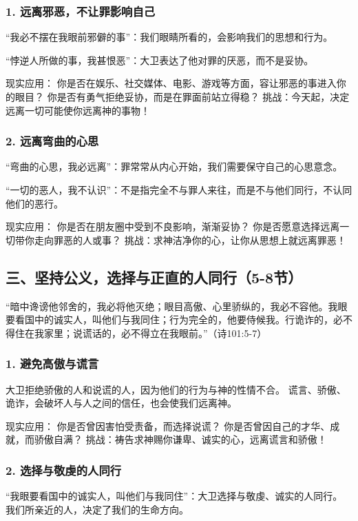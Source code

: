 \documentclass[a4paper, 12pt]{article}
\begin{document}
\subsubsection*{1. 远离邪恶，不让罪影响自己}
\hspace{0.4cm}“我必不摆在我眼前邪僻的事”：我们眼睛所看的，会影响我们的思想和行为。

“悖逆人所做的事，我甚恨恶”：大卫表达了他对罪的厌恶，而不是妥协。

现实应用：
你是否在娱乐、社交媒体、电影、游戏等方面，容让邪恶的事进入你的眼目？
你是否有勇气拒绝妥协，而是在罪面前站立得稳？
挑战：今天起，决定远离一切可能使你远离神的事物！

\subsubsection*{2. 远离弯曲的心思}
\hspace{0.4cm}“弯曲的心思，我必远离”：罪常常从内心开始，我们需要保守自己的心思意念。

“一切的恶人，我不认识”：不是指完全不与罪人来往，而是不与他们同行，不认同他们的恶行。

现实应用：
你是否在朋友圈中受到不良影响，渐渐妥协？
你是否愿意选择远离一切带你走向罪恶的人或事？
挑战：求神洁净你的心，让你从思想上就远离罪恶！

\subsection*{三、坚持公义，选择与正直的人同行（5-8节）}
“暗中谗谤他邻舍的，我必将他灭绝；眼目高傲、心里骄纵的，我必不容他。我眼要看国中的诚实人，叫他们与我同住；行为完全的，他要侍候我。行诡诈的，必不得住在我家里；说谎话的，必不得立在我眼前。”（诗101:5-7）

\subsubsection*{1. 避免高傲与谎言}
\hspace{0.6cm}大卫拒绝骄傲的人和说谎的人，因为他们的行为与神的性情不合。
谎言、骄傲、诡诈，会破坏人与人之间的信任，也会使我们远离神。

现实应用：
你是否曾因害怕受责备，而选择说谎？
你是否曾因自己的才华、成就，而骄傲自满？
挑战：祷告求神赐你谦卑、诚实的心，远离谎言和骄傲！

\subsubsection*{2. 选择与敬虔的人同行}
\hspace{0.4cm}“我眼要看国中的诚实人，叫他们与我同住”：大卫选择与敬虔、诚实的人同行。
我们所亲近的人，决定了我们的生命方向。
\end{document}
